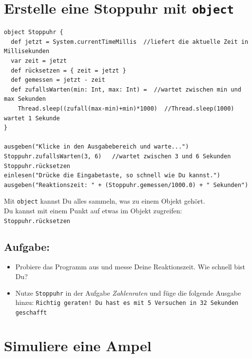 \chapter{Erstelle eine Stoppuhr mit \lstinline{object}}
\begin{lstlisting}[basicstyle={\ttfamily\fontsize{14}{17}\selectfont},numbers=none]
object Stoppuhr {
  def jetzt = System.currentTimeMillis  //liefert die aktuelle Zeit in Millisekunden
  var zeit = jetzt
  def rücksetzen = { zeit = jetzt }
  def gemessen = jetzt - zeit
  def zufallsWarten(min: Int, max: Int) =  //wartet zwischen min und max Sekunden
    Thread.sleep((zufall(max-min)+min)*1000)  //Thread.sleep(1000) wartet 1 Sekunde
}

ausgeben("Klicke in den Ausgabebereich und warte...")
Stoppuhr.zufallsWarten(3, 6)   //wartet zwischen 3 und 6 Sekunden
Stoppuhr.rücksetzen
einlesen("Drücke die Eingabetaste, so schnell wie Du kannst.")
ausgeben("Reaktionszeit: " + (Stoppuhr.gemessen/1000.0) + " Sekunden")
\end{lstlisting}
        
Mit \lstinline{object} kannst Du alles sammeln, was zu einem Objekt gehört.\\
Du kannst mit einem Punkt auf etwas im Objekt zugreifen: \lstinline{Stoppuhr.rücksetzen}
\section*{\color{BrickRed}Aufgabe:}


\begin{itemize}

\item {Probiere das Programm aus und messe Deine Reaktionszeit. Wie schnell bist Du?}
\item {Nutze \lstinline{Stoppuhr} in der Aufgabe {\it Zahlenraten} und füge die folgende Ausgabe hinzu: \lstinline{Richtig geraten! Du hast es mit 5 Versuchen in 32 Sekunden geschafft}}

\end{itemize}


\chapter{Simuliere eine Ampel}
  

